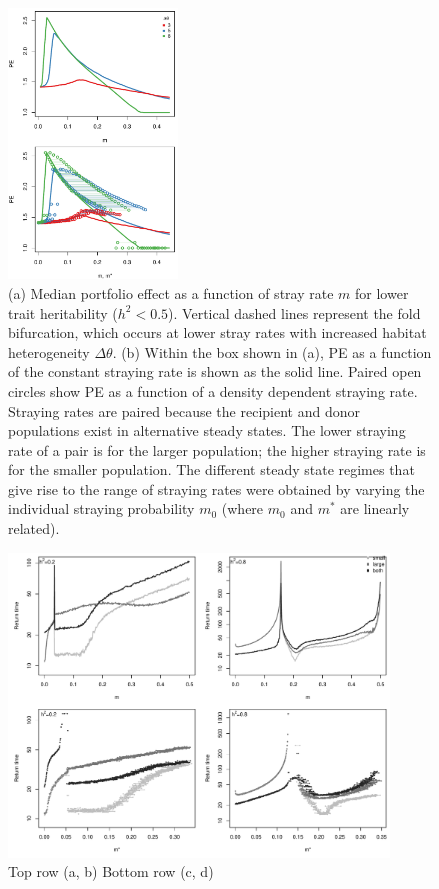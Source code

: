 \documentclass[twocolumn,preprintnumbers,amsmath,amssymb,superscriptaddress]{revtex4}
\begin{document}
\begin{figure}
  \captionsetup{justification=raggedright,
singlelinecheck=false
}
\centering
\includegraphics[width=0.4\textwidth]{figs2/fig_thetaPEmvm.pdf}
\caption{
(a) Median portfolio effect as a function of stray rate $m$ for lower trait heritability ($h^2 < 0.5$).
Vertical dashed lines represent the fold bifurcation, which occurs at lower stray rates with increased habitat heterogeneity $\Delta \theta$.
(b) Within the box shown in (a), PE as a function of the constant straying rate is shown as the solid line. Paired open circles show PE as a function of a density dependent straying rate. Straying rates are paired because the recipient and donor populations exist in alternative steady states. The lower straying rate of a pair is for the larger population; the higher straying rate is for the smaller population.
The different steady state regimes that give rise to the range of straying rates were obtained by varying the individual straying probability $m_0$ (where $m_0$ and $m^*$ are linearly related).
} \label{fig:thetaPE}
\end{figure}

\begin{figure}
  \captionsetup{justification=raggedright,
singlelinecheck=false
}
\centering
\includegraphics[width=0.9\textwidth]{figs2/fig_relax_comb.pdf}
\caption{
Top row (a, b)
Bottom row (c, d)
} \label{fig:relax}
\end{figure}
\end{document}
